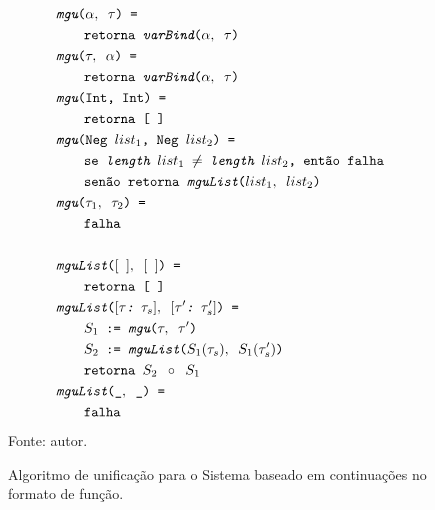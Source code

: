 \begin{figure}[ht!]
  \caption{Algoritmo de unificação para o Sistema baseado em continuações no formato de função.}
  \centering
  \begin{align*}
    & \texttt{\Mgu($\alpha,\Whitespace\tau$) = } \\
    & \qquad{} \texttt{\Return\Whitespace\UnifyVar($\alpha,\Whitespace\tau$)} \\
    & \texttt{\Mgu($\tau,\Whitespace\alpha$) = } \\
    & \qquad{} \texttt{\Return\Whitespace\UnifyVar($\alpha,\Whitespace\tau$)} \\
    & \texttt{\Mgu(\texttt{Int},\Whitespace\texttt{Int}) = } \\
    & \qquad{} \texttt{\Return\Whitespace[$\Whitespace$]} \\
    & \texttt{\Mgu(\texttt{Neg}\Whitespace ${list}_{1}$,\Whitespace\texttt{Neg} ${list}_{2}$) = } \\
    & \qquad{} \texttt{\If \Whitespace \Length\Whitespace${list}_{1}$ $\neq$ \Length\Whitespace${list}_{2}$, \Then \Whitespace \Fail} \\
    & \qquad{} \texttt{\Else\Whitespace\Return\Whitespace\MguList(${list}_{1},\Whitespace{list}_{2}$)} \\
    & \texttt{\Mgu($\tau_1,\Whitespace\tau_2$) = } \\
    & \qquad{} \texttt{\Fail} \\
    \\
    & \texttt{\MguList($[\Whitespace],\Whitespace[\Whitespace]$) = } \\
    & \qquad{} \texttt{\Return\Whitespace[$\Whitespace$]} \\
    & \texttt{\MguList($[\tau\HeadSep\Whitespace\tau_s],\Whitespace[\tau'\HeadSep\Whitespace\tau_s']$) = } \\
    & \qquad{} \texttt{$S_1$\Whitespace:=\Whitespace\Mgu($\tau,\Whitespace\tau'$)} \\
    & \qquad{} \texttt{$S_2$\Whitespace:=\Whitespace\MguList($S_1(\tau_s),\Whitespace S_1(\tau_s')$)} \\
    & \qquad{} \texttt{\Return\Whitespace$S_2\Whitespace \circ\Whitespace S_1$} \\
    & \texttt{\MguList($\_,\Whitespace\_$) = } \\
    & \qquad{} \texttt{\Fail}
  \end{align*}
  \small{Fonte: autor.}
  \label{algo:mgu-cps}
\end{figure}

